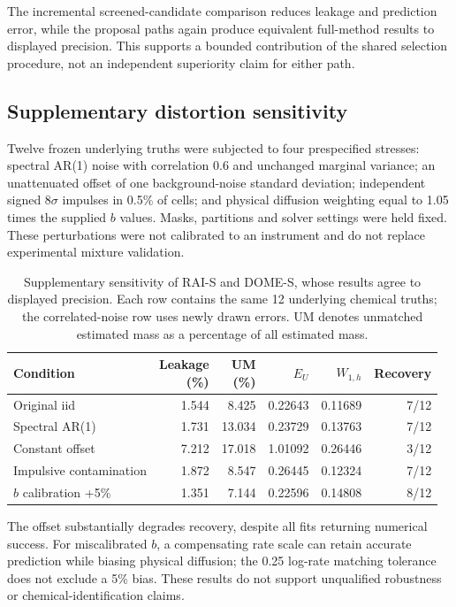 The incremental screened-candidate comparison reduces leakage and prediction
error, while the proposal paths again produce equivalent full-method results
to displayed precision. This supports a bounded contribution of the shared
selection procedure, not an independent superiority claim for either path.

\subsection{Supplementary distortion sensitivity}
Twelve frozen underlying truths were subjected to four prespecified stresses:
spectral AR(1) noise with correlation 0.6 and unchanged marginal variance;
an unattenuated offset of one background-noise standard deviation;
independent signed $8\sigma$ impulses in 0.5\% of cells; and physical diffusion
weighting equal to 1.05 times the supplied $b$ values. Masks, partitions and
solver settings were held fixed. These perturbations were not calibrated to
an instrument and do not replace experimental mixture validation.

\begin{table}[htbp]\centering\small
\caption{Supplementary sensitivity of RAI-S and DOME-S, whose results agree
to displayed precision. Each row contains the same 12 underlying chemical
truths; the correlated-noise row uses newly drawn errors. UM denotes
unmatched estimated mass as a percentage of all estimated mass.}\label{tab:revisionstress}
\begin{tabularx}{\linewidth}{@{}Xrrrrr@{}}\toprule
Condition & \shortstack[r]{Leakage\\(\%)} & \shortstack[r]{UM\\(\%)} & $E_U$ & $W_{1,h}$ & Recovery\\\midrule
Original iid & 1.544 & 8.425 & 0.22643 & 0.11689 & 7/12\\
Spectral AR(1) & 1.731 & 13.034 & 0.23729 & 0.13763 & 7/12\\
Constant offset & 7.212 & 17.018 & 1.01092 & 0.26446 & 3/12\\
Impulsive contamination & 1.872 & 8.547 & 0.26445 & 0.12324 & 7/12\\
$b$ calibration +5\% & 1.351 & 7.144 & 0.22596 & 0.14808 & 8/12\\\bottomrule
\end{tabularx}
\end{table}

The offset substantially degrades recovery, despite all fits returning
numerical success. For miscalibrated $b$, a compensating rate scale can retain
accurate prediction while biasing physical diffusion; the 0.25 log-rate
matching tolerance does not exclude a 5\% bias. These results do not support
unqualified robustness or chemical-identification claims.

